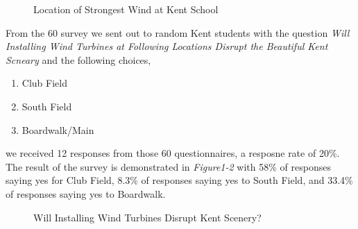 \documentclass[review]{elsarticle}
\begin{document}
\clearpage

\begin{figure}
    \caption{Location of Strongest Wind at Kent School}
    \label{fig:locationpick}
\end{figure}

From the 60 survey we sent out to random Kent students with the question \textit{Will Installing Wind Turbines at Following Locations Disrupt the Beautiful Kent Scneary} 
and the following choices,
\begin{enumerate}
    \item Club Field
    \item South Field
    \item Boardwalk/Main
\end{enumerate}

we received 12 responses from those 60 questionnaires, a resposne rate of 20\%. The result of the survey is demonstrated in \textit{Figure1-2} with 58\% of responses saying yes 
for Club Field, 8.3\% of responses saying yes to South Field, and 33.4\% of responses saying yes to Boardwalk.\\

\begin{figure}[!h]
    \caption{Will Installing Wind Turbines Disrupt Kent Scenery?}
\end{figure}
\end{document}
